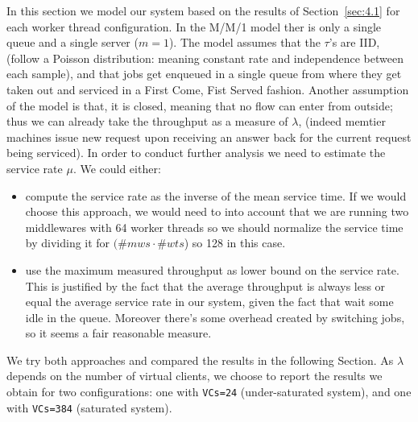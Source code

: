 \documentclass[11pt,a4paper]{article}
\begin{document}
In this section we model our system based on the results of Section~\ref{sec:4.1} for each worker thread configuration.
In the M/M/1 model ther is only a single queue and a single server ($m=1$). The model assumes that the $\tau$'s are IID, (follow a Poisson distribution: meaning constant rate and independence between each sample), and that jobs get enqueued in a single queue from where they get taken out and serviced in a First Come, Fist Served fashion. Another assumption of the model is that, it is closed, meaning that no flow can enter from outside; thus we can already take the throughput as a measure of $\lambda$, (indeed memtier machines issue new request upon receiving an answer back for the current request being serviced). 
In order to conduct further analysis we need to estimate the service rate $\mu$. We could either:
\begin{itemize}
    \item compute the service rate as the inverse of the mean service time. If we would choose this approach, we would need to into account that we are running two middlewares with 64 worker threads so we should normalize the service time by dividing it for $(\#mws \cdot \#wts$) so 128 in this case.
    \item use the maximum measured throughput as lower bound on the service rate. This is justified by the fact that the average throughput is always less or equal the average service rate in our system, given the fact that wait some idle in the queue. Moreover there's some overhead created by switching jobs, so it seems a fair reasonable measure.
\end{itemize}
We try both approaches and compared the results in the following Section.
As $\lambda$ depends on the number of virtual clients, we choose to report the results we obtain for two configurations: one with \texttt{VCs=24} (under-saturated system), and one with \texttt{VCs=384} (saturated system). 
\end{document}

